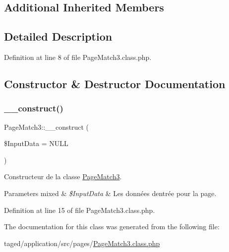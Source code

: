 \subsection*{Additional Inherited Members}


\subsection{Detailed Description}


Definition at line 8 of file Page\+Match3.\+class.\+php.



\subsection{Constructor \& Destructor Documentation}
\mbox{\label{class_page_match3_a0364bbcc5b3685b0aa241ecac15697a4}} 
\subsubsection{\texorpdfstring{\+\_\+\+\_\+construct()}{\_\_construct()}}
{\footnotesize\ttfamily Page\+Match3\+::\+\_\+\+\_\+construct (\begin{DoxyParamCaption}\item[{}]{\$\+Input\+Data = {\ttfamily NULL} }\end{DoxyParamCaption})}

Constructeur de la classe \hyperlink{class_page_match3}{Page\+Match3}.


\begin{DoxyParams}[1]{Parameters}
mixed & {\em \$\+Input\+Data} & Les données d\textquotesingle{}entrée pour la page. \\
\hline
\end{DoxyParams}


Definition at line 15 of file Page\+Match3.\+class.\+php.



The documentation for this class was generated from the following file\+:\begin{DoxyCompactItemize}
\item 
taged/application/src/pages/\hyperlink{_page_match3_8class_8php}{Page\+Match3.\+class.\+php}\end{DoxyCompactItemize}
